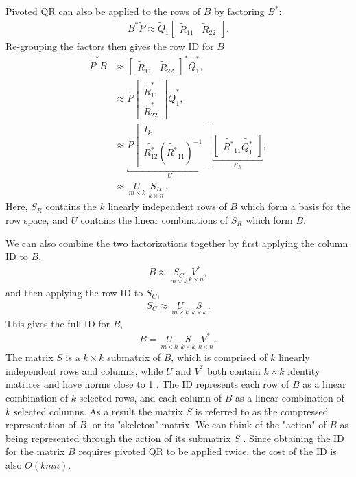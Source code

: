 \documentclass{sfuthesis}
\begin{document}
Pivoted QR can also be applied to the rows of $B$ by factoring $B^*$: 
\begin{align*}
	B^*\tilde{P}\approx \tilde{Q}_1\left[\begin{array}{cc} \tilde{R}_{11} & \tilde{R}_{22} \end{array}\right].
\end{align*}
Re-grouping the factors then gives the row ID for $B$ \cite{ChengEtAl2005}
\begin{align*}
	\tilde{P}^*B& \approx {\left[ \begin{array}{cc} \tilde{R}_{11} & \tilde{R}_{22} \end{array}\right]}^* \tilde{Q}_1^*,\\
	&\approx \tilde{P}\left[\begin{array}{c}\tilde{R}_{11}^* \\ \tilde{R}_{22}^*\end{array}\right] \tilde{Q}_1^*,\\
	& \approx \underbracket{\tilde{P} \left[\begin{array}{c} I_k \\ \tilde{R^*_{12}}{(\tilde{R^*}_{11})}^{-1} \end{array} \right]}_{U} \underbracket{ \left[ \begin{array}{cc} \tilde{R^*}_{11}\tilde{Q_1^*} \end{array} \right]}_{S_R},\\
	& \approx \underset{ \ m \times k \ }{U}\underset{ \ k \times n \ }{S_R}.
\end{align*}
Here, $S_R$ contains the $k$ linearly independent rows of $B$ which form a basis for the row space, and $U$ contains the linear combinations of $S_R$ which form $B$. 

We can also combine the two factorizations together by first applying the column ID to $B$, 
\begin{align*}
	B \approx \underset{\ m\times k \ }{S_C}\underset{k \times n}{V^*},
\end{align*}
and then applying the row ID to $S_C$,
\begin{align*}
	S_C \approx \underset{\ m \times k \ }{U}\underset{ \ k \times k \ }{S}.
\end{align*}
This gives the full ID for $B$,
\begin{align*}
	B=\underset{ \ m \times k \ }{U} \underset{\ k\times k \ }{S}\underset{ \ k \times n \ }{V^*}.
\end{align*}
The matrix $S$ is a $k \times k$ submatrix of $B$, which is comprised of $k$ linearly independent rows and columns, while $U$ and $V^*$ both contain $k \times k$ identity matrices and have norms close to 1 \cite{ChengEtAl2005}. The ID represents each row of $B$ as a linear combination of $k$ selected rows, and each column of $B$ as a linear combination of $k$ selected columns. As a result the matrix $S$ is referred to as the compressed representation of $B$, or its "skeleton" matrix. We can think of the "action" of $B$ as being represented through the action of its submatrix $S$ \cite{ChengEtAl2005}. Since obtaining the ID for the matrix $B$ requires pivoted QR to be applied twice, the cost of the ID is also $O(kmn)$. 
\end{document}
